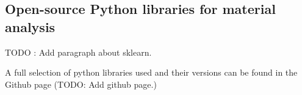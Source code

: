 \begin{table}[!ht]
\centering
\caption{A selection of cloud services that offers database-storage. Abbreviations used are Computational Materials Repository (CMR), NIMS Materials Database (MatNavi), PRedictive Integrated Structural Materials Science (PRISMS), Materials Platform for Data Science (MPDS) and the Materials Data Fascility (MDF).}
\label{tab:cloud_service}
\noindent{}
\end{table}

\subsection{Open-source Python libraries for material analysis}


TODO : Add paragraph about sklearn.

A full selection of python libraries used and their versions can be found in the Github page (TODO: Add github page.)

